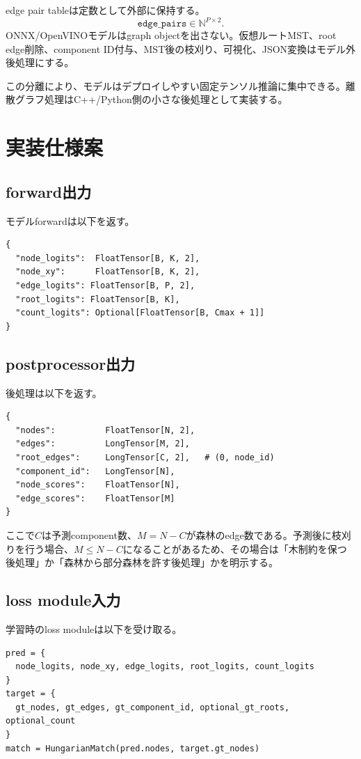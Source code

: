 \documentclass[11pt,a4paper]{article}
\begin{document}
edge pair tableは定数として外部に保持する。
\begin{equation}
  \texttt{edge\_pairs}\in \mathbb{N}^{P\times 2}.
\end{equation}
ONNX/OpenVINOモデルはgraph objectを出さない。仮想ルートMST、root edge削除、component ID付与、MST後の枝刈り、可視化、JSON変換はモデル外後処理にする。

この分離により、モデルはデプロイしやすい固定テンソル推論に集中できる。離散グラフ処理はC++/Python側の小さな後処理として実装する。

\section{実装仕様案}
\subsection{forward出力}
モデルforwardは以下を返す。
\begin{verbatim}
{
  "node_logits":  FloatTensor[B, K, 2],
  "node_xy":      FloatTensor[B, K, 2],
  "edge_logits": FloatTensor[B, P, 2],
  "root_logits": FloatTensor[B, K],
  "count_logits": Optional[FloatTensor[B, Cmax + 1]]
}
\end{verbatim}

\subsection{postprocessor出力}
後処理は以下を返す。
\begin{verbatim}
{
  "nodes":          FloatTensor[N, 2],
  "edges":          LongTensor[M, 2],
  "root_edges":     LongTensor[C, 2],   # (0, node_id)
  "component_id":   LongTensor[N],
  "node_scores":    FloatTensor[N],
  "edge_scores":    FloatTensor[M]
}
\end{verbatim}
ここで$C$は予測component数、$M=N-C$が森林のedge数である。予測後に枝刈りを行う場合、$M\le N-C$になることがあるため、その場合は「木制約を保つ後処理」か「森林から部分森林を許す後処理」かを明示する。

\subsection{loss module入力}
学習時のloss moduleは以下を受け取る。
\begin{verbatim}
pred = {
  node_logits, node_xy, edge_logits, root_logits, count_logits
}
target = {
  gt_nodes, gt_edges, gt_component_id, optional_gt_roots, optional_count
}
match = HungarianMatch(pred.nodes, target.gt_nodes)
\end{verbatim}
\end{document}
